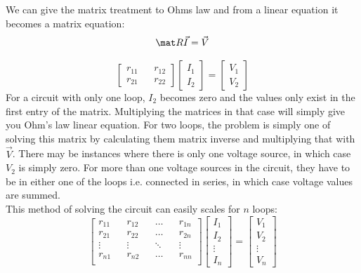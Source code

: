 \documentclass[conference]{IEEEtran}
\begin{document}
    \noindent
    We can give the matrix treatment to Ohms law and from a linear equation it becomes a matrix equation:
    \begin{equation}
        \label{eqn:Ohm_steroids}
        \mat R \vec I = \vec V
    \end{equation}
    
    \begin{equation}
        \begin{bmatrix}
        r_{11} && r_{12} \\
        r_{21} && r_{22}
        \end{bmatrix}
        \begin{bmatrix}
        I_1 \\ I_2
        \end{bmatrix}
        =
        \begin{bmatrix}
        V_1 \\ V_2
        \end{bmatrix}
    \end{equation}
    \noindent
    For a circuit with only one loop, $I_2$ becomes zero and the values only exist in the first entry of the matrix. Multiplying the matrices in that case will simply give you Ohm's law linear equation. For two loops, the problem is simply one of solving this matrix by calculating them matrix inverse and multiplying that with $\vec V$. There may be instances where there is only one voltage source, in which case $V_2$ is simply zero. For more than one voltage sources in the circuit, they have to be in either one of the loops i.e. connected in series, in which case voltage values are summed.\\
    This method of solving the circuit can easily scales for $n$ loops:
    \begin{equation}
        \begin{bmatrix}
        r_{11} && r_{12} && \dots && r_{1n}\\
        r_{21} && r_{22} && \dots && r_{2n} \\
        \vdots && \vdots && \ddots && \vdots \\
        r_{n1} && r_{n2} && \dots && r_{nn} \\
        \end{bmatrix}
        \begin{bmatrix}
        I_1 \\ I_2 \\  \vdots \\ I_n
        \end{bmatrix}
        =
        \begin{bmatrix}
        V_1 \\ V_2 \\ \vdots \\ V_n
        \end{bmatrix}
    \end{equation}
    
\end{document}
